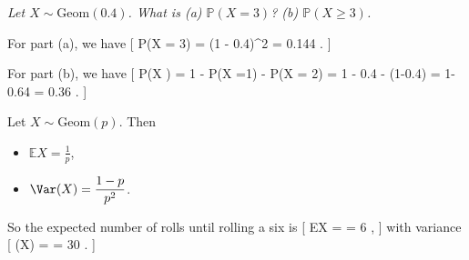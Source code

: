 \documentclass[
  letterpaper,
]{report}
\providecommand{\tightlist}{%
  \setlength{\itemsep}{0pt}\setlength{\parskip}{0pt}}\usepackage{longtable,booktabs,array}
\theoremstyle{definition}
\theoremstyle{definition}
\theoremstyle{remark}
\begin{document}
\emph{Let \(X \sim \mathrm{Geom}(0.4)\). What is (a)
\(\mathbb P(X = 3)\)? (b) \(\mathbb P(X \geq 3)\).}

For part (a), we have {[} \mathbb P(X = 3) = (1 - 0.4)\^{}2  =
0.144 . {]}

For part (b), we have {[} \mathbb P(X ) = 1 - \mathbb P(X =1) -
\mathbb P(X = 2) = 1 - 0.4 - (1-0.4) = 1- 0.64 = 0.36 . {]}

Let \(X \sim \text{Geom}(p)\). Then

\begin{itemize}
\tightlist
\item
  \(\mathbb EX = \displaystyle\frac1p\),
\item
  \(\Var(X) = \displaystyle\frac{1-p}{p^2}\).
\end{itemize}

So the expected number of rolls until rolling a six is {[} \mathbb EX =
 = 6 , {]} with variance {[} \Var(X) =
 = 30 . {]}
\end{document}
